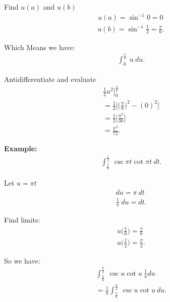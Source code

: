\documentclass{report}
\begin{document}
  \bigbreak \noindent \bigbreak \noindent
  Find $u(a)$ and $u(b)$
  \begin{align*}
    u(a) = \sin^{-1}{0} = 0 \\
    a(b) = \sin^{-1}{\frac{1}{2}} = \frac{\pi}{6}
  .\end{align*}

  \bigbreak \noindent \bigbreak \noindent
  Which Means we have:
  \begin{align*}
    \int_{0}^{\frac{\pi}{6}}\ u\ du
  .\end{align*}

  \bigbreak \noindent \bigbreak \noindent
  Antidifferentiate and evaluate
  \begin{align*}
    \frac{1}{2}u^{2}\bigg]_{0}^{\frac{\pi}{6}} \\
    = \frac{1}{2} \bigg[\bigg(\frac{\pi}{6}\bigg)^{2} - (0)^{2}\bigg] \\
    = \frac{1}{2}\bigg[\frac{\pi^{2}}{36}\bigg] \\
    \boxed{= \frac{\pi^{2}}{72}}
  .\end{align*}

  \pagebreak \bigbreak \noindent
  \bigbreak \noindent 
  \begin{mdframed}
    \textbf{Example: }
    \begin{align*}
      \int_{\frac{1}{6}}^{\frac{1}{2}}\ \csc{\pi t}\cot{\pi t}\ dt
    .\end{align*}
  \end{mdframed}

  \bigbreak \noindent \bigbreak \noindent
  Let $u=\pi t $
  \begin{align*}
    du = \pi\ dt \\
    \frac{1}{\pi}\ du = dt
  .\end{align*}

  \bigbreak \noindent \bigbreak \noindent
  Find limits:
  \begin{align*}
    u\bigg(\frac{1}{6}\bigg)  = \frac{\pi}{6} \\
    u\bigg(\frac{1}{2}\bigg) = \frac{\pi}{2}
  .\end{align*}

  \bigbreak \noindent \bigbreak \noindent
  So we have:
  \begin{align*}
    \int_{\frac{\pi}{6}}^{\frac{\pi}{2}}\ \csc{u}\cot{u}\ \frac{1}{\pi}du \\
    = \frac{1}{\pi}\int_{\frac{\pi}{6}}^{\frac{\pi}{2}}\ \csc{u}\cot{u}\ du
  .\end{align*}
\end{document}
